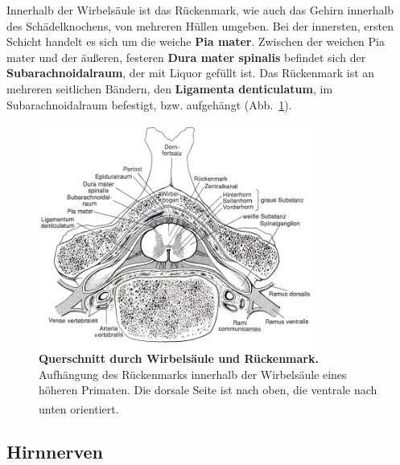 \documentclass[12pt,a4paper,pdftex]{article}
\begin{document}
\noindent Innerhalb der Wirbelsäule ist das Rückenmark, wie auch das Gehirn innerhalb des Schädelknochens, von mehreren Hüllen umgeben. Bei der innersten, ersten Schicht handelt es sich um die weiche \textbf{Pia mater}. Zwischen der weichen Pia mater und der äußeren, festeren \textbf{Dura mater spinalis} befindet sich der \textbf{Subarachnoidalraum}, der mit Liquor gefüllt ist. Das Rückenmark ist an mehreren seitlichen Bändern, den \textbf{Ligamenta denticulatum}, im Subarachnoidalraum befestigt, bzw. aufgehängt (Abb.~\ref{fig:ruckenmark_wirbelsaeule}). 

\begin{figure}[H]
     \centering
     \includegraphics[width=0.8\textwidth]{pictures/Bilder_Jule/Andere/rueckenmark_wirbelsaeule.png}
     \caption[Querschnitt durch Wirbelsäule und Rückenmark]{\textbf{Querschnitt durch Wirbelsäule und Rückenmark.} Aufhängung des Rückenmarks innerhalb der Wirbelsäule eines höheren Primaten. Die dorsale Seite ist nach oben, die ventrale nach unten orientiert. \textsuperscript{\cite[6]{storch2012lehrbuchzoo}}}
     \label{fig:ruckenmark_wirbelsaeule}
\end{figure}


\subsection{Hirnnerven}
\label{subsec:Hirnnnerven}
\end{document}
